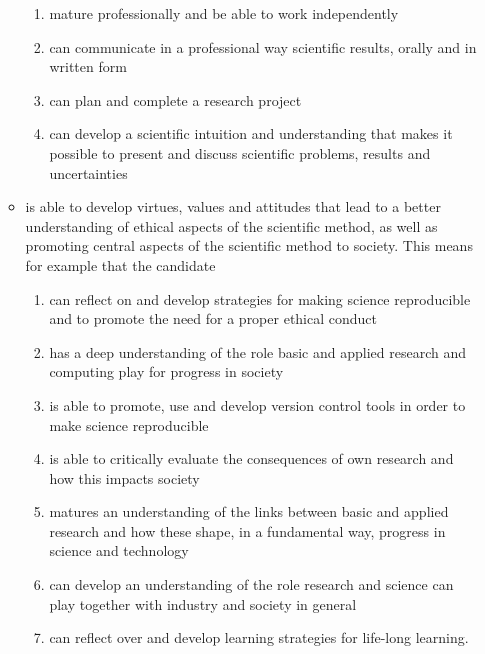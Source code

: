 \documentclass{article}
\begin{document}
\begin{itemize}
\begin{itemize}
\begin{enumerate}
 \item mature professionally and be able to work independently

 \item can communicate in a professional way scientific results, orally and in written form

 \item can plan and complete a research project

 \item can develop a scientific intuition and understanding that makes it possible to present and discuss scientific problems, results and uncertainties

\end{enumerate}

\noindent
 \item is able to develop virtues, values and attitudes that lead to  a better understanding of ethical aspects of the scientific method, as well as promoting central aspects of the scientific method to society. This means for example that the candidate
\begin{enumerate}

 \item can reflect on and develop strategies for making science reproducible and to promote the need for a proper ethical conduct

 \item has a deep understanding of the role basic and applied  research and computing play for progress in society

 \item is able to promote, use and develop version control tools in order to make science reproducible

 \item is able to critically evaluate the consequences of own research and how this impacts society

 \item matures an understanding of the links between basic and applied research and how these shape, in a fundamental way,  progress in science and technology

 \item can develop an understanding of the role research and science can play together with industry and society in general

 \item can reflect over and develop learning strategies for life-long learning.
\end{enumerate}

\noindent
\end{itemize}

\noindent
\end{itemize}
\end{document}
